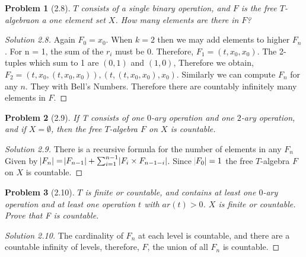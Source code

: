 \documentclass{article}
\theoremstyle{problemstyle}
\newtheorem{problem}{Problem}
\begin{document}
\begin{problem}[2.8]
$T$ consists of a single binary operation, and $F$ is the free $T$-algebraon a one element set $X$. How many elements are there in $F$?
\end{problem}
\begin{proof}[Solution 2.8]
Again $F_0 = {x_0}$. 
When $k = 2$ then we may add elements to higher $F_n$. For n = 1, the sum of the $r_i$ must be $0$. Therefore, $F_1 = {(t,x_0,x_0)}$. The 2-tuples which sum to 1 are $(0,1)$ and $(1,0)$, Therefore we obtain, $F_2 = {(t,x_0,(t,x_0,x_0)),(t,(t,x_0,x_0),x_0)}$. Similarly we can compute $F_n$ for any $n$. They with Bell's Numbers. Therefore there are countably infinitely many elements in $F$. 
\end{proof}
\begin{problem}[2.9]
If T consists of one $0$-ary operation and one $2$-ary operation, and if $X = \emptyset$, then the free $T$-algebra $F$ on $X$ is countable. 
\end{problem}
\begin{proof}[Solution 2.9]
There is a recursive formula for the number of elements in any $F_n$ Given by $\abs{F_n} = \abs{F_{n-1}}+\sum_{i=1}^{n-1}\abs{F_i\times F_{n-1-i}}$. Since $\abs{F_0} = 1$ the free $T$-algebra $F$ on $X$ is countable.
\end{proof}
\begin{problem}[2.10]
$T$ is finite or countable, and contains at least one $0$-ary operation and at least one operation $t$ with $ar(t)>0$. $X$ is finite or countable. Prove that F is countable.  
\end{problem}
\begin{proof}[Solution 2.10]
The cardinality of $F_n$ at each level is countable, and there are a countable infinity of levels, therefore, $F$, the union of all $F_n$ is countable.  
\end{proof}
\end{document}
